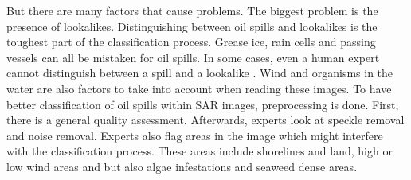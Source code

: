 But there are many factors that cause problems. The biggest problem is the presence of lookalikes. Distinguishing between oil spills and lookalikes is the toughest part of the classification process. Grease ice, rain cells and passing vessels can all be mistaken for oil spills\cite{Brekke200595}. In some cases, even a human expert cannot distinguish between a spill and a lookalike \cite{Keramitsoglou2006640}. Wind and organisms in the water are also factors to take into account when reading these images. To have better classification of oil spills within SAR images, preprocessing is done. First, there is a general quality assessment. Afterwards, experts look at speckle removal and noise removal. Experts also flag areas in the image which might interfere with the classification process. These areas include shorelines and land, high or low wind areas and but also algae infestations and seaweed dense areas\cite{fingas2014review}.

